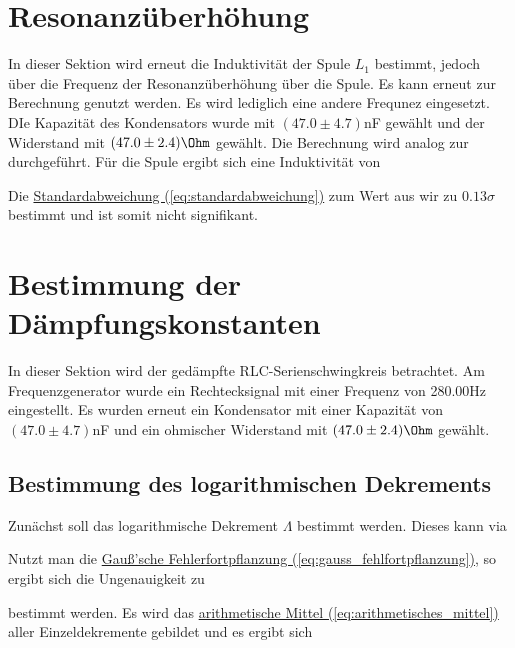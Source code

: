 
\section{Resonanzüberhöhung}
\label{sec:A5}
In dieser Sektion wird erneut die Induktivität der Spule $L_1$ bestimmt, jedoch über die Frequenz der Resonanzüberhöhung über die Spule.
Es kann erneut  zur Berechnung genutzt werden. Es wird lediglich eine andere Frequnez eingesetzt. DIe Kapazität des Kondensators wurde mit $(47.0 \pm 4.7)$nF gewählt und der Widerstand mit $(47.0 \pm 2.4)\Ohm$ gewählt.
Die Berechnung wird analog zur  durchgeführt. Für die Spule ergibt sich eine Induktivität von

Die \hyperref[eq:standardabweichung]{Standardabweichung (\ref*{eq:standardabweichung})} zum Wert aus  wir zu $0.13\sigma$ bestimmt und ist somit nicht signifikant.

\section{Bestimmung der Dämpfungskonstanten}
\label{sec:A6}
In dieser Sektion wird der gedämpfte RLC-Serienschwingkreis betrachtet. Am Frequenzgenerator wurde ein Rechtecksignal mit einer Frequenz von 280.00Hz eingestellt. Es wurden erneut ein Kondensator mit einer Kapazität von $(47.0 \pm 4.7)$nF und ein ohmischer Widerstand mit $(47.0 \pm 2.4)\Ohm$ gewählt.

\subsection{Bestimmung des logarithmischen Dekrements}
Zunächst soll das logarithmische Dekrement $\Lambda$ bestimmt werden. Dieses kann via

Nutzt man die \hyperref[eq:gauss_fehlfortpflanzung]{Gauß'sche Fehlerfortpflanzung (\ref*{eq:gauss_fehlfortpflanzung})}, so ergibt sich die Ungenauigkeit zu

bestimmt werden. Es wird das \hyperref[eq:arithmetisches_mittel]{arithmetische Mittel (\ref*{eq:arithmetisches_mittel})} aller Einzeldekremente gebildet und es ergibt sich

